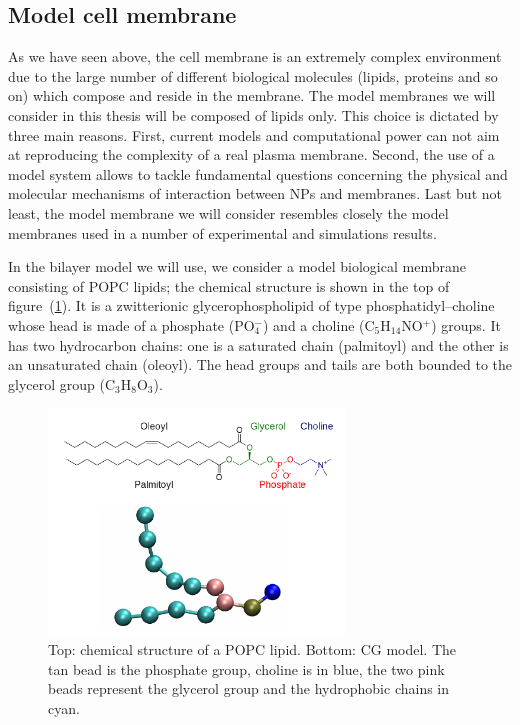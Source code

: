 \subsection{Model cell membrane}
As we have seen above, the cell membrane is an extremely complex environment due to the large number of different biological molecules (lipids, proteins and so on) which compose and reside in the membrane. The model membranes we will consider in this thesis will be composed of lipids only. This choice is dictated by three main reasons. First, current models and computational power can not aim at reproducing the complexity of a real plasma membrane. Second, the use of a model system allows to tackle fundamental questions concerning the physical and molecular mechanisms of interaction between \acp{NP} and membranes. Last but not least, the model membrane we will consider resembles closely the model membranes used in a number of experimental and simulations results.  

In the bilayer model we will use, we consider a model biological membrane consisting of \ac{POPC} lipids; the 
chemical structure is shown in the top of figure~(\ref{fig:popc}). It is a zwitterionic glycerophospholipid of 
type phosphatidyl--choline whose head is made of a phosphate (PO$_4^-$) and a choline (C$_5$H$_{14}$NO$^+$) 
groups. It has two hydrocarbon chains: one is a saturated chain (palmitoyl) and the other is an unsaturated chain 
(oleoyl). The head groups and tails are both bounded to the glycerol group (C$_3$H$_8$O$_3$).
\begin{figure}[!ht]
	\centering
	\includegraphics[width=0.7\textwidth]{./img/POPC/popc}
	\caption{Top: chemical structure of a \acs{POPC} lipid. Bottom: \martini{} \acs{CG} model. The tan bead is the phosphate group, choline is in blue, the two pink beads represent the glycerol group and the hydrophobic chains in cyan.}
	\label{fig:popc}
\end{figure}

